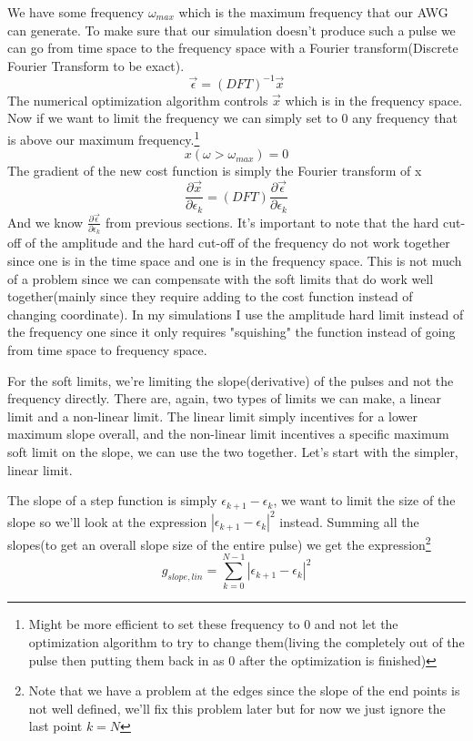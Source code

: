 \documentclass[english, a4paper, 12pt, twoside]{article}
\numberwithin{equation}{section} %
\begin{document}
We have some frequency \( \omega_{max} \) which is the maximum frequency that our AWG can generate. To make sure that our simulation doesn't produce such a pulse we can go from time space to the frequency space with a Fourier transform(Discrete Fourier Transform to be exact).
\[
    \vec{\epsilon} = (DFT)^{-1} \vec{x}
\]
The numerical optimization algorithm controls \(\vec{x}\) which is in the frequency space. Now if we want to limit the frequency we can simply set to 0 any frequency that is above our maximum frequency.\footnote{Might be more efficient to set these frequency to 0 and not let the optimization algorithm to try to change them(living the completely out of the pulse then putting them back in as 0 after the optimization is finished)}
\[
    x(\omega > \omega_{max}) = 0
\]
The gradient of the new cost function is simply the Fourier transform of x
\[
    \frac{\partial \vec{x}}{\partial \epsilon_k} = (DFT) \frac{\partial \vec{\epsilon}}{\partial \epsilon_k}
\]
And we know \(\frac{\partial \vec{\epsilon}}{\partial \epsilon_k}\) from previous sections.
It's important to note that the hard cut-off of the amplitude and the hard cut-off of the frequency do not work together since one is in the time space and one is in the frequency space. This is not much of a problem since we can compensate with the soft limits that do work well together(mainly since they require adding to the cost function instead of changing coordinate). In my simulations I use the amplitude hard limit instead of the frequency one since it only requires "squishing" the function instead of going from time space to frequency space.

For the soft limits, we're limiting the slope(derivative) of the pulses and not the frequency directly. There are, again, two types of limits we can make, a linear limit and a non-linear limit. The linear limit simply incentives for a lower maximum slope overall, and the non-linear limit incentives a specific maximum soft limit on the slope, we can use the two together. Let's start with the simpler, linear limit.

The slope of a step function is simply \(\epsilon_{k+1} - \epsilon_{k}\), we want to limit the size of the slope so we'll look at the expression \(|\epsilon_{k+1} - \epsilon_{k}|^2\) instead. Summing all the slopes(to get an overall slope size of the entire pulse) we get the expression\footnote{Note that we have a problem at the edges since the slope of the end points is not well defined, we'll fix this problem later but for now we just ignore the last point \(k=N\)}
\begin{equation}\label{eq:g_slope,lin}
    g_{slope, lin} = \sum_{k=0}^{N-1} |\epsilon_{k+1} - \epsilon_{k}|^2
\end{equation}{}
\end{document}
